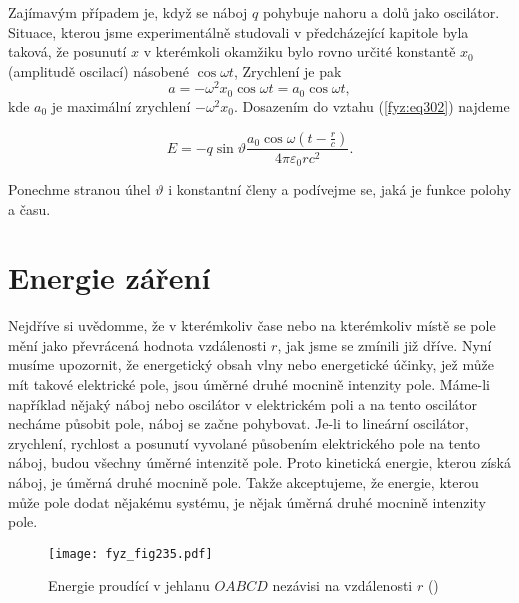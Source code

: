     Zajímavým případem je, když se náboj \(q\) pohybuje nahoru a dolů jako oscilátor. Situace, 
    kterou jsme experimentálně studovali v předcházející kapitole byla taková, že posunutí \(x\) v 
    kterémkoli okamžiku bylo rovno určité konstantě \(x_0\) (amplitudě oscilací) násobené \(\cos 
    \omega t\), Zrychlení je pak
    \begin{equation}\label{fyz:eq303}
      a = -\omega^2x_0\cos\omega t = a_0\cos\omega t,
    \end{equation}
    kde \(a_0\) je maximální zrychlení \(-\omega^2x_0\). Dosazením do vztahu (\ref{fyz:eq302}) 
    najdeme

    \begin{equation}\label{fyz:eq304}
      E = -q\sin\vartheta\frac{a_0\cos\omega\left(t-\frac{r}{c}\right)}{4\pi\varepsilon_0rc^2}.
    \end{equation}
    
    Ponechme stranou úhel \(\vartheta\) i konstantní členy a podívejme se, jaká je funkce polohy a 
    času.
    
  \section{Energie záření}\label{fyz:IchapXXIXsecII}
    Nejdříve si uvědomme, že v kterémkoliv čase nebo na kterémkoliv místě se pole mění jako 
    převrácená hodnota vzdálenosti \(r\), jak jsme se zmínili již dříve. Nyní musíme upozornit, že 
    energetický obsah vlny nebo energetické účinky, jež může mít takové elektrické pole, jsou 
    úměrné druhé mocnině intenzity pole. Máme-li například nějaký náboj nebo oscilátor v 
    elektrickém poli a na tento oscilátor necháme působit pole, náboj se začne pohybovat. Je-li to 
    lineární oscilátor, zrychlení, rychlost a posunutí vyvolané působením elektrického pole na 
    tento náboj, budou všechny úměrné intenzitě pole. Proto kinetická energie, kterou získá náboj, 
    je úměrná druhé mocnině pole. Takže akceptujeme, že energie, kterou může pole dodat nějakému 
    systému, je nějak úměrná druhé mocnině intenzity pole.

    \begin{figure}[ht!] %
      \centering
      \texttt{[image: fyz\_fig235.pdf]}
      \caption{Energie proudící v jehlanu \(OABCD\) nezávisi na vzdálenosti \(r\)
               (\cite[s.~381]{Feynman01})}
      \label{fyz:fig235}
    \end{figure}
    
